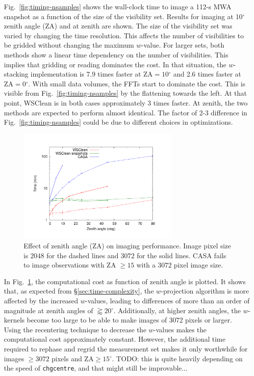 \documentclass[useAMS,usenatbib]{mn2e}
\newcommand{\degree}{\ensuremath{^{\circ}}\xspace}
\begin{document}
Fig.~\ref{fig:timing-nsamples} shows the wall-clock time to image a 112-s MWA snapshot as a function of the size of the visibility set. Results for imaging at 10\degree zenith angle (ZA) and at zenith are shown. The size of the visibility set was varied by changing the time resolution. This affects the number of visibilities to be gridded without changing the maximum $w$-value. For larger sets, both methods show a linear time dependency on the number of visibilities. This implies that gridding or reading dominates the cost. In that situation, the $w$-stacking implementation is 7.9 times faster at $\textrm{ZA}=10\degree$ and 2.6 times faster at $\textrm{ZA}=0\degree$. With small data volumes, the FFTs start to dominate the cost. This is visible from Fig.~\ref{fig:timing-nsamples} by the flattening towards the left. At that point, WSClean is in both cases approximately 3 times faster. At zenith, the two methods are expected to perform almost identical. The factor of 2-3 difference in Fig.~\ref{fig:timing-nsamples} could be due to different choices in optimizations.

\begin{figure}
\begin{center}
\includegraphics[width=8cm]{img/benchmark-zenith-angle/za}
\caption{Effect of zenith angle (ZA) on imaging performance. Image pixel size is $2048$ for the dashed lines and $3072$ for the solid lines. CASA fails to image observations with ZA $\ge 15$ with a $3072$ pixel image size. }
\label{fig:timing-zenith-angle}
\end{center}
\end{figure}

In Fig.~\ref{fig:timing-zenith-angle}, the computational cost as function of zenith angle is plotted. It shows that, as expected from \S\ref{sec:time-complexity}, the $w$-projection algorithm is more affected by the increased $w$-values, leading to differences of more than an order of magnitude at zenith angles of $\gtrapprox 20$\degree. Additionally, at higher zenith angles, the $w$-kernels become too large to be able to make images of 3072 pixels or larger. Using the recentering technique to decrease the $w$-values makes the computational cost approximately constant. However, the additional time required to rephase and regrid the measurement set makes it only worthwhile for images $\ge3072$ pixels and $\textrm{ZA}\ge15\degree$. TODO: this is quite heavily depending on the speed of \texttt{chgcentre}, and that might still be improvable...
\end{document}
